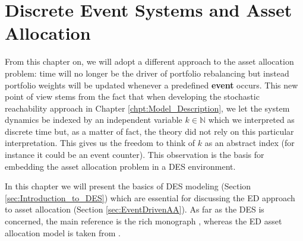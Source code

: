 \chapter{Discrete Event Systems and Asset Allocation}\label{chpt:ED}
From this chapter on, we will adopt a different approach to the asset allocation problem: time will no longer be the driver of portfolio rebalancing but instead portfolio weights  will be updated whenever a predefined \textbf{event} occurs. This new point of view stems from the fact that when developing the stochastic reachability approach in Chapter \ref{chpt:Model_Description}, we let the system dynamics be indexed by an independent variable $k \in \mathbb{N}$ which we interpreted as discrete time but, as a matter of fact, the theory did not rely on this particular interpretation. This gives us the freedom to think of $k$ as an abstract index (for instance it could be an event counter). This observation is the basis for embedding the asset allocation problem in a \gls{DES} environment. 

In this chapter we will present the basics of \gls{DES} modeling (Section \ref{sec:Introduction_to_DES}) which are essential for discussing the \gls{ED} approach to asset allocation (Section \ref{sec:EventDrivenAA}). As far as the \gls{DES} is concerned, the main reference is the rich monograph \cite{cassandras2009}, whereas the \gls{ED} asset allocation model is taken from \cite{specchio2011}.


